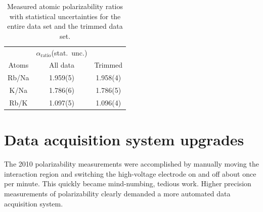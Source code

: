 \begin{table}
\caption{\label{polRatiosTableTrim}Measured atomic polarizability ratios with statistical uncertainties for the entire data set and the trimmed data set.}
\begin{center}
\begin{tabular}{c c c}
\hline\hline
 &  $\alpha_\textrm{ratio}$(stat.~unc.) \\
Atoms & All data & Trimmed \\
\hline
Rb/Na & 1.959(5) &1.958(4)  \\
K/Na    & 1.786(6) &1.786(5)  \\
Rb/K    & 1.097(5) &1.096(4)  \\
\hline\hline
\end{tabular}
\end{center}
\end{table}





\section{Data acquisition system upgrades}
\label{newDAQ}

The 2010 polarizability measurements were accomplished by manually moving the interaction region and switching the high-voltage electrode on and off about once per minute. This quickly became mind-numbing, tedious work. Higher precision measurements of polarizability clearly demanded a more automated data acquisition system.

